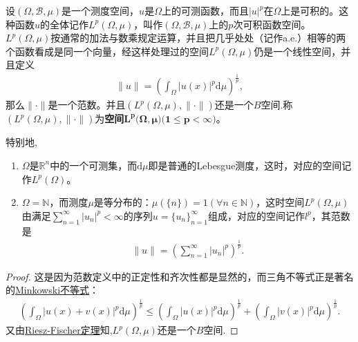 \documentclass[../../main.tex]{subfiles}%
\begin{document}
\begin{proposition}\label{proposition:常见B空间11111}
设$(\Omega,\mathscr{B},\mu)$是一个测度空间，$u$是$\Omega$上的可测函数，而且$|u|^p$在$\Omega$上是可积的。这种函数$u$的全体记作$L^p(\Omega,\mu)$，叫作$(\Omega,\mathscr{B},\mu)$上的$p$次可积函数空间。$L^p(\Omega,\mu)$按通常的加法与数乘规定运算，并且把几乎处处（记作a.e.）相等的两个函数看成是同一个向量，经这样处理过的空间$L^p(\Omega,\mu)$仍是一个线性空间，并且定义
\begin{align*}
\|u\|=\left(\int_\Omega|u(x)|^p\mathrm{d}\mu\right)^{\frac{1}{p}},
\end{align*}
那么$\|\cdot\|$是一个范数。并且$(L^p(\Omega,\mu),\|\cdot\|)$还是一个$B$空间.称$(L^p(\Omega,\mu),\|\cdot\|)$为\textbf{空间}$\boldsymbol{L}^{\boldsymbol{p}}\boldsymbol{(\Omega },\boldsymbol{\mu }\mathbf{)(}\mathbf{1}\leqslant \boldsymbol{p}<\boldsymbol{\infty )}$。

特别地,
\begin{enumerate}[(1)]
\item $\Omega$是$\mathbb{R}^n$中的一个可测集，而$\mathrm{d}\mu$即是普通的Lebesgue测度，这时，对应的空间记作$L^p(\Omega)$。

\item $\Omega=\mathbb{N}$，而测度$\mu$是等分布的：$\mu(\{n\})=1(\forall n\in\mathbb{N})$，这时空间$L^p(\Omega,\mu)$由满足$\sum_{n=1}^\infty|u_n|^p<\infty$的序列$u=\{u_n\}_{n=1}^\infty$组成，对应的空间记作$l^p$，其范数是
\begin{align*}
\|u\|=\left(\sum_{n=1}^\infty|u_n|^p\right)^{\frac{1}{p}}.
\end{align*}
\end{enumerate}
\end{proposition}
\begin{proof}

这是因为范数定义中的正定性和齐次性都是显然的，而三角不等式正是著名的\hyperref[Real-Analysis-theorem:实变函数--Minkowski不等式]{Minkowski不等式}：
\begin{align*}
\left(\int_\Omega|u(x)+v(x)|^p\mathrm{d}\mu\right)^{\frac{1}{p}}\leqslant\left(\int_\Omega|u(x)|^p\mathrm{d}\mu\right)^{\frac{1}{p}}+\left(\int_\Omega|v(x)|^p\mathrm{d}\mu\right)^{\frac{1}{p}}.
\end{align*}
又由\hyperref[Real-Analysis-theorem:Riesz-Fischer定理的另一种常用形式]{Riesz-Fischer定理}知,$L^p(\Omega,\mu)$还是一个$B$空间.
\end{proof}
\end{document}
